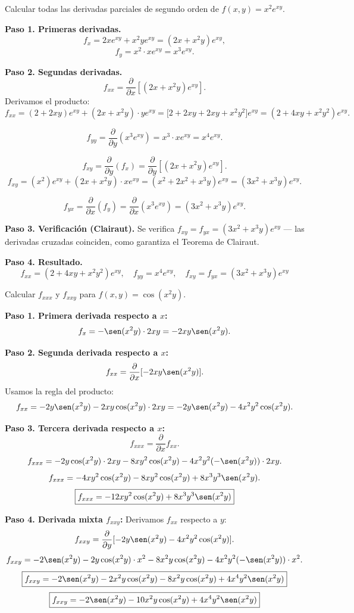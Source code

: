 \begin{example}
Calcular todas las derivadas parciales de segundo orden de
$f(x,y)=x^2 e^{xy}$.
\begin{myproof}
\textbf{Paso 1. Primeras derivadas.}
\[
f_x = 2x e^{xy} + x^2 y e^{xy} = (2x + x^2 y)e^{xy},
\]
\[
f_y = x^2 \cdot x e^{xy} = x^3 e^{xy}.
\]

\textbf{Paso 2. Segundas derivadas.}
\[
f_{xx} = \frac{\partial}{\partial x}\left[(2x+x^2y)e^{xy}\right].
\]
Derivamos el producto:
\[
f_{xx} = (2+2xy)e^{xy} + (2x+x^2y)\cdot y e^{xy}
= \bigl[2+2xy + 2xy + x^2 y^2\bigr]e^{xy}
= (2+4xy+x^2 y^2)e^{xy}.
\]

\[
f_{yy} = \frac{\partial}{\partial y}(x^3 e^{xy})
= x^3 \cdot x e^{xy} = x^4 e^{xy}.
\]

\[
f_{xy} = \frac{\partial}{\partial y}(f_x)
= \frac{\partial}{\partial y}\left[(2x+x^2y)e^{xy}\right].
\]
\[
f_{xy} = (x^2)e^{xy} + (2x+x^2y)\cdot x e^{xy}
= (x^2 + 2x^2 + x^3 y)e^{xy}
= (3x^2 + x^3 y)e^{xy}.
\]

\[
f_{yx} = \frac{\partial}{\partial x}(f_y)
= \frac{\partial}{\partial x}(x^3 e^{xy})
= (3x^2 + x^3 y)e^{xy}.
\]

\textbf{Paso 3. Verificación (Clairaut).}
Se verifica $f_{xy}=f_{yx}=(3x^2+x^3y)e^{xy}$ — las derivadas cruzadas coinciden, como garantiza el Teorema de Clairaut.

\textbf{Paso 4. Resultado.}
\[
\boxed{
f_{xx}=(2+4xy+x^2y^2)e^{xy},\quad
f_{yy}=x^4 e^{xy},\quad
f_{xy}=f_{yx}=(3x^2+x^3y)e^{xy}
}
\]
\end{myproof}
\end{example}

\begin{example}
Calcular $f_{xxx}$ y $f_{xxy}$ para $f(x,y)=\cos(x^2 y)$.
\begin{myproof}
\textbf{Paso 1. Primera derivada respecto a $x$:}
\[
f_x = -\sen(x^2 y)\cdot 2xy = -2xy\sen(x^2 y).
\]

\textbf{Paso 2. Segunda derivada respecto a $x$:}
\[
f_{xx} = \frac{\partial}{\partial x}[-2xy\sen(x^2 y)].
\]
Usamos la regla del producto:
\[
f_{xx} = -2y\sen(x^2 y) - 2xy\cos(x^2 y)\cdot 2xy
= -2y\sen(x^2 y) - 4x^2 y^2 \cos(x^2 y).
\]

\textbf{Paso 3. Tercera derivada respecto a $x$:}
\[
f_{xxx} = \frac{\partial}{\partial x} f_{xx}.
\]
\[
f_{xxx} = -2y\cos(x^2 y)\cdot 2xy
-8xy^2\cos(x^2 y) - 4x^2 y^2(-\sen(x^2 y))\cdot 2xy.
\]
\[
f_{xxx} = -4xy^2\cos(x^2 y) - 8xy^2\cos(x^2 y)
+ 8x^3 y^3 \sen(x^2 y).
\]
\[
\boxed{f_{xxx} = -12xy^2\cos(x^2 y) + 8x^3 y^3 \sen(x^2 y)}
\]

\textbf{Paso 4. Derivada mixta $f_{xxy}$:}
Derivamos $f_{xx}$ respecto a $y$:
\[
f_{xxy} = \frac{\partial}{\partial y}[-2y\sen(x^2 y) - 4x^2 y^2 \cos(x^2 y)].
\]
\[
f_{xxy} = -2\sen(x^2 y) - 2y\cos(x^2 y)\cdot x^2
-8x^2 y\cos(x^2 y) - 4x^2 y^2 (-\sen(x^2 y))\cdot x^2.
\]
\[
\boxed{f_{xxy} = -2\sen(x^2 y) - 2x^2 y\cos(x^2 y)
-8x^2 y\cos(x^2 y) + 4x^4 y^2\sen(x^2 y)}
\]
\[
\boxed{f_{xxy} = -2\sen(x^2 y) -10x^2 y\cos(x^2 y)
+ 4x^4 y^2\sen(x^2 y)}
\]
\end{myproof}
\end{example}


